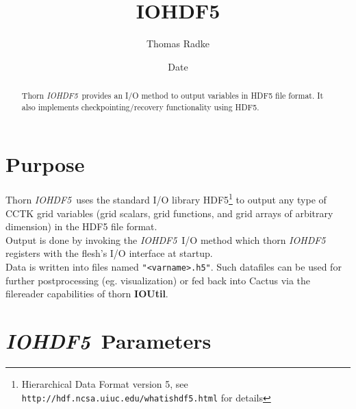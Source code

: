 \documentclass{article}
\begin{document}
\title{IOHDF5}
\author{Thomas Radke}
\date{$ $Date$ $}

\maketitle


\ifx\ThisThorn\undefined
\newcommand{\ThisThorn}{{\it IOHDF5}}
\else
\renewcommand{\ThisThorn}{{\it IOHDF5}}
\fi

\begin{abstract}
Thorn \ThisThorn\ provides an I/O method to output variables in HDF5 file format.
It also implements checkpointing/recovery functionality using HDF5.
\end{abstract}
%
%
\section{Purpose}
%
Thorn \ThisThorn\ uses the standard I/O library HDF5\footnote{Hierarchical Data
Format version 5, see {\tt http://hdf.ncsa.uiuc.edu/whatishdf5.html} for details}
to output any type of CCTK grid variables (grid scalars, grid functions, and
grid arrays of arbitrary dimension) in the HDF5 file format.\\

Output is done by invoking the \ThisThorn\ I/O method which thorn \ThisThorn
registers with the flesh's I/O interface at startup.\\

Data is written into files named {\tt "<varname>.h5"}.
Such datafiles can be used for further postprocessing (eg. visualization)
or fed back into Cactus via the filereader capabilities of thorn {\bf IOUtil}.


\section{\ThisThorn\ Parameters}
\end{document}
